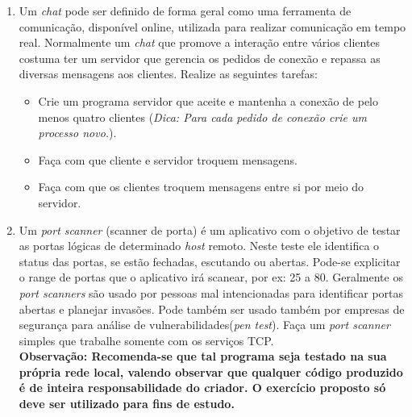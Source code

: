 \documentclass[a4paper,10pt]{article}
\begin{document}
\begin{enumerate}
   \item Um \emph{chat} pode ser definido de forma geral como uma ferramenta de comunicação, disponível online, utilizada para realizar comunicação
	em tempo real. Normalmente um \emph{chat} que promove a interação entre vários clientes costuma ter um servidor que gerencia os pedidos de 
	conexão e repassa as diversas mensagens aos clientes. Realize as seguintes tarefas:
	\begin{itemize}
	 \item Crie um programa servidor que aceite e mantenha a conexão de pelo menos quatro clientes (\emph{Dica: Para cada pedido de conexão crie 
	    um processo novo.}).
	 \item Faça com que cliente e servidor troquem mensagens. 
	 \item Faça com que os clientes troquem mensagens entre si por meio do servidor. 
	\end{itemize}
   \item Um \emph{port scanner} (scanner de porta) é um aplicativo com o objetivo de testar as portas lógicas de determinado \emph{host} remoto. 
	Neste teste ele identifica o status das portas, se estão fechadas, escutando ou abertas. Pode-se explicitar o range de portas que o 
	aplicativo irá scanear, por ex: 25 a 80. Geralmente os \emph{port scanners} são usado por pessoas mal intencionadas para identificar 
	portas abertas e planejar invasões. Pode também ser usado também por empresas de segurança para análise de vulnerabilidades(\emph{pen test}).
	Faça um \emph{port scanner} simples que trabalhe somente com os serviços TCP.\\
	\textbf{Observação: Recomenda-se que tal programa seja testado na sua própria rede local, valendo observar que qualquer código produzido 
	é de inteira responsabilidade do criador. O exercício proposto só deve ser utilizado para fins de estudo.}
  \end{enumerate}
\end{document}
